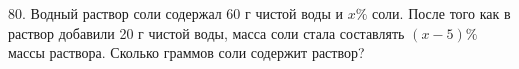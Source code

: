80. Водный раствор соли содержал 60 г чистой воды и $x\%$ соли. После того как в раствор добавили 20 г чистой воды, масса соли стала составлять $(x-5)\%$ массы раствора. Сколько граммов соли содержит раствор?\\
